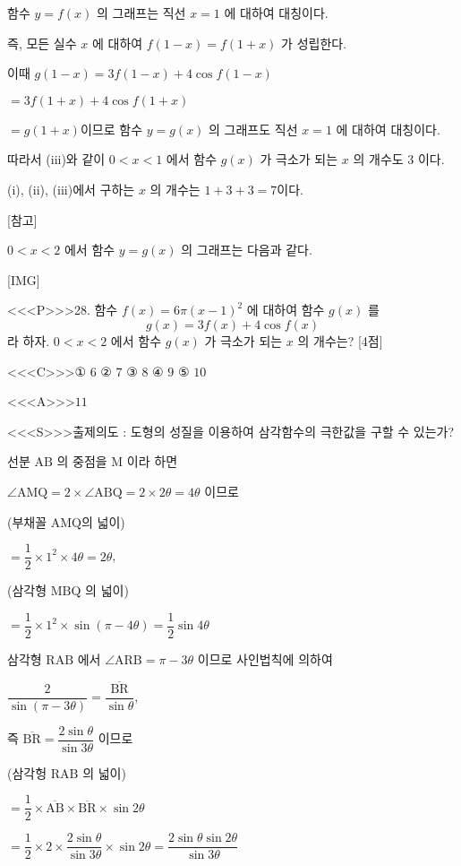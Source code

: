 \documentclass{oblivoir}
\begin{document}
함수 $y=f(x)$ 의 그래프는 직선 $x=1$ 에 대하여 대칭이다.

즉, 모든 실수 $x$ 에 대하여 $f(1-x)=f(1+x)$ 가 성립한다.

이때
$g(1-x)=3 f(1-x)+4 \cos f(1-x)$

$=3 f(1+x)+4 \cos f(1+x)$

$=g(1+x)$이므로 함수 $y=g(x)$ 의 그래프도 직선 $x=1$ 에 대하여 대칭이다.

따라서 (iii)와 같이 $0<  x<  1$ 에서 함수 $g(x)$ 가 극소가 되는 $x$ 의 개수도 $3$ 이다.

(i), (ii), (iii)에서 구하는 $x$ 의 개수는 $1+3+3=7$이다.

[참고]

$0<  x<  2$ 에서 함수 $y=g(x)$ 의 그래프는 다음과 같다.

[IMG]

<<<P>>>28. 함수 $f(x)=6 \pi(x-1)^{2}$ 에 대하여 함수 $g(x)$ 를
$$
g(x)=3 f(x)+4 \cos f(x)
$$
라 하자. $0<  x<  2$ 에서 함수 $g(x)$ 가 극소가 되는 $x$ 의 개수는? [4점]

<<<C>>>① $6$
② $7$
③ $8$
④ $9$
⑤ $10$


<<<A>>>$11$

<<<S>>>출제의도 : 도형의 성질을 이용하여 삼각함수의 극한값을 구할 수 있는가?


선분 $\mathrm{AB}$ 의 중점을 $\mathrm{M}$ 이라 하면

$\angle \mathrm{AMQ}=2 \times \angle \mathrm{ABQ}=2 \times 2 \theta=4 \theta$
이므로

(부채꼴 $\mathrm{AMQ}$의 넓이)

$=\dfrac{1}{2} \times 1^{2} \times 4 \theta=2 \theta$,

(삼각형 $\mathrm{MBQ}$ 의 넓이)

$=\dfrac{1}{2} \times 1^{2} \times \sin (\pi-4 \theta)=\dfrac{1}{2} \sin 4 \theta$

삼각형 $\mathrm{RAB}$ 에서 $\angle \mathrm{ARB}=\pi-3 \theta$ 이므로
사인법칙에 의하여

$\dfrac{2}{\sin (\pi-3 \theta)}=\dfrac{\overline{\mathrm{BR}}}{\sin \theta}$,

즉
$\overline{\mathrm{BR}}=\dfrac{2 \sin \theta}{\sin 3 \theta}$
이므로

(삼각헝 $\mathrm{RAB}$ 의 넓이)

$=\dfrac{1}{2} \times \overline{\mathrm{AB}} \times \overline{\mathrm{BR}} \times \sin 2 \theta$

$=\dfrac{1}{2} \times 2 \times \dfrac{2 \sin \theta}{\sin 3 \theta} \times \sin 2 \theta=\dfrac{2 \sin \theta \sin 2 \theta}{\sin 3 \theta}$
\end{document}
